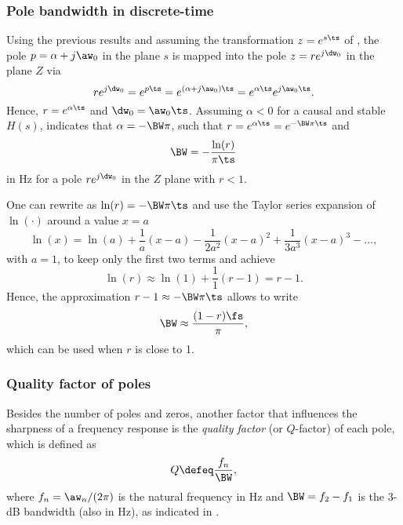 \subsubsection{Pole bandwidth in discrete-time}
Using the previous results and assuming the transformation $z = e^{s \ts}$ of , the pole $p = \alpha + j \aw_0$ in the plane $s$ is mapped into the pole $z=r e^{j \dw_0}$ in the plane $Z$ via
\[
r e^{j \dw_0} = e^{p \ts} = e^{(\alpha + j \aw_0) \ts} = e^{\alpha \ts} e^{j \aw_0 \ts}.
\]
Hence, $r = e^{\alpha \ts}$ and $\dw_0 = \aw_0 \ts$. Assuming $\alpha < 0$ for a causal and stable $H(s)$,  indicates that $\alpha = - \BW \pi$, such that $r = e^{\alpha \ts} = e^{- \BW \pi \ts}$ and
\begin{equation}
\label{eq:pole_bw_discretetime}
\BW = - \frac{ \ln (r)}{ \pi \ts}
\end{equation}
in Hz for a pole $r e^{j \dw_0}$ in the $Z$ plane with $r < 1$.

One can rewrite  as $\ln(r) = - \BW \pi \ts$ and
use the Taylor series expansion of $\ln(\cdot)$ around a value $x=a$
\[
\ln(x) = \ln(a) + \frac{1}{a} (x-a) - \frac{1}{2a^2} (x-a)^2 + \frac{1}{3a^3} (x-a)^3 - \ldots,
\]
with $a=1$, to keep only the first two terms and achieve
\[
\ln(r) \approx \ln(1) + \frac{1}{1} (r-1) = r -1.
\]
Hence, the approximation $r-1 \approx - \BW \pi \ts$ allows to write
\begin{equation}
\BW \approx \frac{ (1-r) \fs}{ \pi },
\label{eq:approximation_pole_bw_discretetime}
\end{equation}
which can be used when $r$ is close to 1.


\subsubsection{Quality factor of poles}

Besides the number of poles and zeros, another factor that influences 
the sharpness of a frequency response 
is the \emph{quality factor} (or $Q$-factor) of each 
pole, which is defined as
\begin{equation}
Q \defeq \frac{f_n}{ \BW},
\label{eq:qFactorPoleDefinition}
\end{equation}
where $f_n = \aw_n / (2 \pi)$ is the natural frequency in Hz and $\BW=f_2 - f_1$ is the 3-dB bandwidth (also in Hz), as indicated in .

